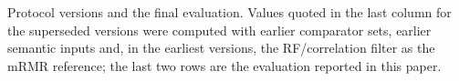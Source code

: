 \documentclass[final,5p,twocolumn]{elsarticle}
\providecommand{\DIFdeltex}[1]{{\protect\color{red} \scriptsize #1}} %
\providecommand{\DIFdelbegin}{} %
\providecommand{\DIFdelFL}[1]{\DIFdel{#1}} %
\providecommand{\DIFdel}[1]{\texorpdfstring{\DIFdeltex{#1}}{}} %
\begin{document}
\DIFdelbegin %
{%
\DIFdelFL{Protocol versions and the final evaluation. Values quoted in the last column for the superseded versions were computed with earlier comparator sets, earlier semantic inputs and, in the earliest versions, the RF/correlation filter as the mRMR reference; the last two rows are the evaluation reported in this paper.}}
\end{document}

